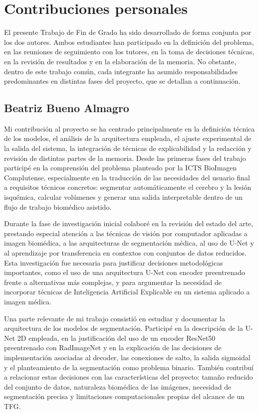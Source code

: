 \chapter*{Contribuciones personales}
\label{cap:contribucionesPersonales}

El presente Trabajo de Fin de Grado ha sido desarrollado de forma conjunta por los dos autores. Ambos estudiantes han participado en la definición del problema, en las reuniones de seguimiento con los tutores, en la toma de decisiones técnicas, en la revisión de resultados y en la elaboración de la memoria. No obstante, dentro de este trabajo común, cada integrante ha asumido responsabilidades predominantes en distintas fases del proyecto, que se detallan a continuación.

\section*{Beatriz Bueno Almagro}

Mi contribución al proyecto se ha centrado principalmente en la definición técnica de los modelos, el análisis de la arquitectura empleada, el ajuste experimental de la salida del sistema, la integración de técnicas de explicabilidad y la redacción y revisión de distintas partes de la memoria. Desde las primeras fases del trabajo participé en la comprensión del problema planteado por la ICTS BioImagen Complutense, especialmente en la traducción de las necesidades del usuario final a requisitos técnicos concretos: segmentar automáticamente el cerebro y la lesión isquémica, calcular volúmenes y generar una salida interpretable dentro de un flujo de trabajo biomédico asistido.

Durante la fase de investigación inicial colaboré en la revisión del estado del arte, prestando especial atención a las técnicas de visión por computador aplicadas a imagen biomédica, a las arquitecturas de segmentación médica, al uso de U-Net y al aprendizaje por transferencia en contextos con conjuntos de datos reducidos. Esta investigación fue necesaria para justificar decisiones metodológicas importantes, como el uso de una arquitectura U-Net con encoder preentrenado frente a alternativas más complejas, y para argumentar la necesidad de incorporar técnicas de Inteligencia Artificial Explicable en un sistema aplicado a imagen médica.

Una parte relevante de mi trabajo consistió en estudiar y documentar la arquitectura de los modelos de segmentación. Participé en la descripción de la U-Net 2D empleada, en la justificación del uso de un encoder ResNet50 preentrenado con RadImageNet y en la explicación de las decisiones de implementación asociadas al decoder, las conexiones de salto, la salida sigmoidal y el planteamiento de la segmentación como problema binario. También contribuí a relacionar estas decisiones con las características del proyecto: tamaño reducido del conjunto de datos, naturaleza biomédica de las imágenes, necesidad de segmentación precisa y limitaciones computacionales propias del alcance de un TFG.

